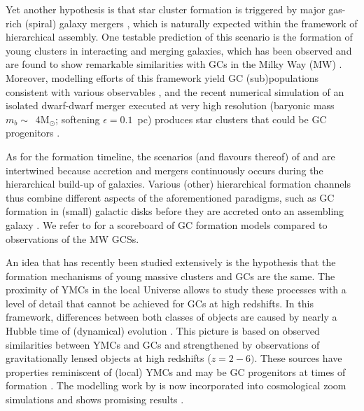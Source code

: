 \documentclass[a4paper,fleqn,usenatbib]{mnras}
\newcommand{\Sun}[0]{\ensuremath{_{\odot}}}
\begin{document}
Yet another hypothesis is that star cluster formation is triggered by major 
gas-rich (spiral) galaxy mergers \citep{1987nngp.proc...18S, 1992ApJ...384...50A},
which is naturally expected within the framework of hierarchical assembly. One
testable prediction of this scenario is the formation of young clusters in
interacting and merging galaxies, which has been observed and are found to show 
remarkable similarities with GCs in the Milky Way (MW) \citep[e.g.][]{
1995AJ....109..960W, 1996AJ....112..416H, 1999AJ....118..752Z, 1999AJ....118.1551W}.
Moreover, modelling efforts of this framework yield GC (sub)populations consistent 
with various observables \citep[e.g.][]{2010ApJ...718.1266M, 2018MNRAS.480.2343C}, 
and the recent numerical simulation of an isolated dwarf-dwarf merger executed at 
very high resolution (baryonic mass $m_b \sim$~4M\Sun; softening $\epsilon = 0.1$~pc) 
produces star clusters that could be GC progenitors \citep{
2019arXiv190509840L}.

As for the formation timeline, the scenarios (and flavours thereof) of \citet{
1985ApJ...298...18F} and \citet{1992ApJ...384...50A} are intertwined because
accretion and mergers continuously occurs during the hierarchical build-up of
galaxies. Various (other) hierarchical formation channels thus combine different
aspects of the aforementioned paradigms, such as GC formation in (small) galactic
disks before they are accreted onto an assembling galaxy \citep[e.g.][]{
2000ApJ...533..869C, 2002ApJ...567..853C, 2002MNRAS.333..383B, 2003egcs.conf..224G}. 
We refer to \citet{2001astro.ph..8034G} for a scoreboard of GC formation models 
compared to observations of the MW GCSs.

An idea that has recently been studied extensively is the hypothesis that the formation
mechanisms of young massive clusters \citep[YMCs, see][for a review]{2010ARA&A..48..431P} 
and GCs are the same. The proximity of YMCs in the local Universe allows to study these 
processes with a level of detail that cannot be achieved for GCs at high redshifts. In 
this framework, differences between both classes of objects are caused by nearly a 
Hubble time of (dynamical) evolution \citep[e.g.][]{1987degc.book.....S}. This picture 
is based on observed similarities between YMCs and GCs
\citep[e.g.][]{1992AJ....103..691H,1999AJ....118.1551W} and strengthened by observations
of gravitationally lensed objects at high redshifts ($z = 2-6)$. These sources have 
properties reminiscent of (local) YMCs and may be GC progenitors at times of formation 
\citep{2017MNRAS.467.4304V,2017ApJ...843L..21J}. The modelling work by 
\citet{2011MNRAS.414.1339K,2012MNRAS.421.1927K,2015MNRAS.454.1658K} is now 
incorporated into cosmological zoom simulations and shows promising results
\citep{2018MNRAS.475.4309P,2019MNRAS.486.3134K}.
\end{document}
